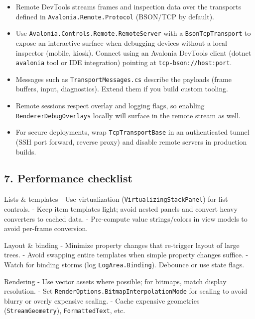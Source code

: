 \begin{itemize}
\tightlist
\item
  Remote DevTools streams frames and inspection data over the transports
  defined in \passthrough{\lstinline!Avalonia.Remote.Protocol!}
  (BSON/TCP by default).
\item
  Use \passthrough{\lstinline!Avalonia.Controls.Remote.RemoteServer!}
  with a \passthrough{\lstinline!BsonTcpTransport!} to expose an
  interactive surface when debugging devices without a local inspector
  (mobile, kiosk). Connect using an Avalonia DevTools client (dotnet
  \passthrough{\lstinline!avalonia!} tool or IDE integration) pointing
  at \passthrough{\lstinline!tcp-bson://host:port!}.
\item
  Messages such as \passthrough{\lstinline!TransportMessages.cs!}
  describe the payloads (frame buffers, input, diagnostics). Extend them
  if you build custom tooling.
\item
  Remote sessions respect overlay and logging flags, so enabling
  \passthrough{\lstinline!RendererDebugOverlays!} locally will surface
  in the remote stream as well.
\item
  For secure deployments, wrap
  \passthrough{\lstinline!TcpTransportBase!} in an authenticated tunnel
  (SSH port forward, reverse proxy) and disable remote servers in
  production builds.
\end{itemize}

\subsection{7. Performance checklist}\label{performance-checklist}

Lists \& templates - Use virtualization
(\passthrough{\lstinline!VirtualizingStackPanel!}) for list controls. -
Keep item templates light; avoid nested panels and convert heavy
converters to cached data. - Pre-compute value strings/colors in view
models to avoid per-frame conversion.

Layout \& binding - Minimize property changes that re-trigger layout of
large trees. - Avoid swapping entire templates when simple property
changes suffice. - Watch for binding storms (log
\passthrough{\lstinline!LogArea.Binding!}). Debounce or use state flags.

Rendering - Use vector assets where possible; for bitmaps, match display
resolution. - Set
\passthrough{\lstinline!RenderOptions.BitmapInterpolationMode!} for
scaling to avoid blurry or overly expensive scaling. - Cache expensive
geometries (\passthrough{\lstinline!StreamGeometry!}),
\passthrough{\lstinline!FormattedText!}, etc.

